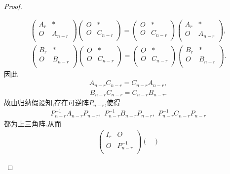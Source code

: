 \documentclass[../../main.tex]{subfiles}%
\begin{document}
\begin{proof}
\begin{enumerate}[(1)]
\begin{align*}
\begin{pmatrix}
A_r&		*\\
O&		A_{n-r}\\
\end{pmatrix} \begin{pmatrix}
O&		*\\
O&		C_{n-r}\\
\end{pmatrix} =\begin{pmatrix}
O&		*\\
O&		C_{n-r}\\
\end{pmatrix} \begin{pmatrix}
A_r&		*\\
O&		A_{n-r}\\
\end{pmatrix},
\end{align*}
\begin{align*}
\begin{pmatrix}
B_r&		*\\
O&		B_{n-r}\\
\end{pmatrix} \begin{pmatrix}
O&		*\\
O&		C_{n-r}\\
\end{pmatrix} =\begin{pmatrix}
O&		*\\
O&		C_{n-r}\\
\end{pmatrix} \begin{pmatrix}
B_r&		*\\
O&		B_{n-r}\\
\end{pmatrix}.
\end{align*}
因此
\begin{align*}
A_{n-r}C_{n-r}=C_{n-r}A_{n-r},
\end{align*}
\begin{align*}
B_{n-r}C_{n-r}=C_{n-r}B_{n-r}.
\end{align*}
故由归纳假设知,存在可逆阵$P_{n-r}$,使得
\begin{align*}
P_{n-r}^{-1}A_{n-r}P_{n-r},\,\,P_{n-r}^{-1}B_{n-r}P_{n-r},\,\,P_{n-r}^{-1}C_{n-r}P_{n-r}
\end{align*}
都为上三角阵.从而
\begin{align*}
\begin{pmatrix}
I_r&		O\\
O&		P_{n-r}^{-1}\\
\end{pmatrix} \begin{pmatrix}

\end{pmatrix}
\end{align*}
\end{enumerate}
\end{proof}
\end{document}
